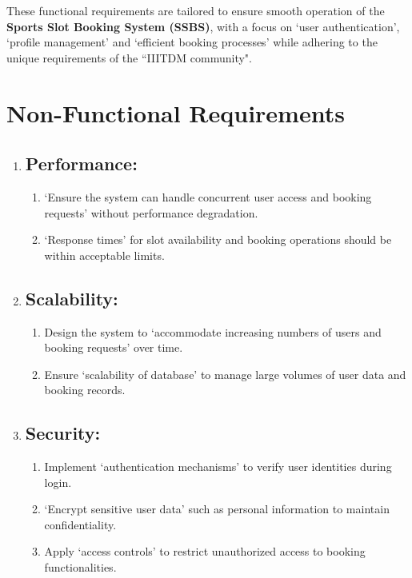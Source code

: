 \documentclass[12pt]{article}
\begin{document}
\begin{enumerate}
\end{enumerate}

\vspace{0.2cm}

\newpage

\noindent These functional requirements are tailored to ensure smooth operation of the \textbf{Sports Slot Booking System (SSBS)}, with a focus on `user authentication', `profile management' and `efficient booking processes' while adhering to the unique requirements of the ``IIITDM community".

\section{Non-Functional Requirements}

\begin{enumerate}[label=\arabic*.]
    \item[] \subsection{Performance:}
    \begin{enumerate}[label=\alph*)]
        \item `Ensure the system can handle concurrent user access and booking requests' without performance degradation.
        \item `Response times' for slot availability and booking operations should be within acceptable limits.
    \end{enumerate}

    \vspace{0.4cm}

    \item[] \subsection{Scalability:}
    \begin{enumerate}[label=\alph*)]
        \item Design the system to `accommodate increasing numbers of users and booking requests' over time.
        \item Ensure `scalability of database' to manage large volumes of user data and booking records.
    \end{enumerate}

    \vspace{0.4cm}

    \item[] \subsection{Security:}
    \begin{enumerate}[label=\alph*)]
        \item Implement `authentication mechanisms' to verify user identities during login.
        \item `Encrypt sensitive user data' such as personal information to maintain confidentiality.
        \item Apply `access controls' to restrict unauthorized access to booking functionalities.
    \end{enumerate}


\end{enumerate}
\end{document}
